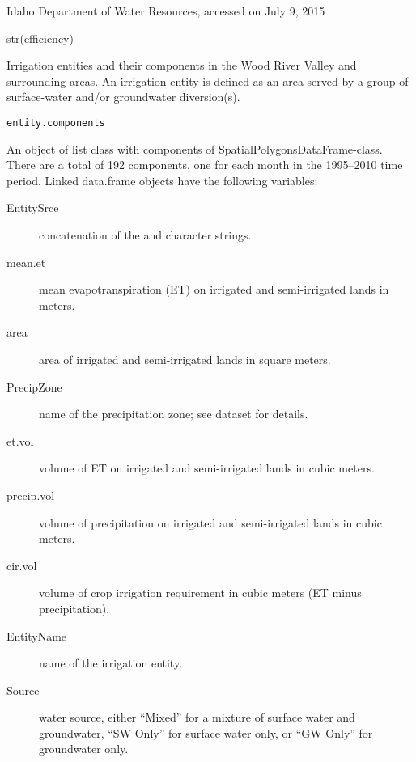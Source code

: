 \documentclass[a4paper]{book}
\begin{document}
%
\begin{Source}\relax
Idaho Department of Water Resources, accessed on July 9, 2015
\end{Source}
%
\begin{Examples}
\begin{ExampleCode}
str(efficiency)

\end{ExampleCode}
\end{Examples}
%
\begin{Description}\relax
Irrigation entities and their components in the Wood River Valley and surrounding areas.
An irrigation entity is defined as an area served by a group of surface-water and/or
groundwater diversion(s).
\end{Description}
%
\begin{Usage}
\begin{verbatim}
entity.components
\end{verbatim}
\end{Usage}
%
\begin{Format}
An object of list class with components of SpatialPolygonsDataFrame-class.
There are a total of 192 components, one for each month in the 1995--2010 time period.
Linked data.frame objects have the following variables:
\begin{description}

\item[EntitySrce] concatenation of the  and  character strings.
\item[mean.et] mean evapotranspiration (ET) on irrigated and semi-irrigated lands in meters.
\item[area] area of irrigated and semi-irrigated lands in square meters.
\item[PrecipZone] name of the precipitation zone;
see  dataset for details.
\item[et.vol] volume of ET on irrigated and semi-irrigated lands in cubic meters.
\item[precip.vol] volume of precipitation on irrigated and semi-irrigated lands in cubic meters.
\item[cir.vol] volume of crop irrigation requirement in cubic meters (ET minus precipitation).
\item[EntityName] name of the irrigation entity.
\item[Source] water source, either ``Mixed'' for a mixture of surface water and groundwater,
``SW Only'' for surface water only, or ``GW Only'' for groundwater only.

\end{description}

\end{Format}
\end{document}
